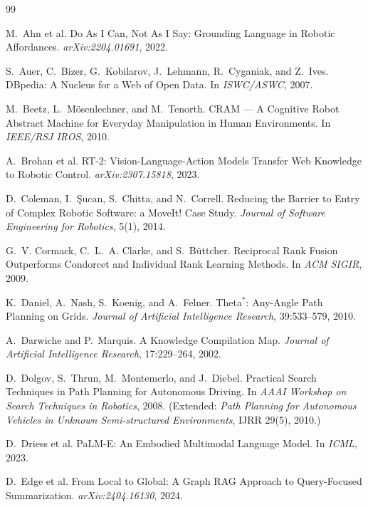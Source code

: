 \documentclass[10pt,a4paper]{article}
\begin{document}
\begin{thebibliography}{99}
\small

M.~Ahn et al.
\newblock Do As I Can, Not As I Say: Grounding Language in Robotic Affordances.
\newblock \emph{arXiv:2204.01691}, 2022.

S.~Auer, C.~Bizer, G.~Kobilarov, J.~Lehmann, R.~Cyganiak, and Z.~Ives.
\newblock DBpedia: A Nucleus for a Web of Open Data.
\newblock In \emph{ISWC/ASWC}, 2007.

M.~Beetz, L.~M{\"o}senlechner, and M.~Tenorth.
\newblock CRAM --- A Cognitive Robot Abstract Machine for Everyday Manipulation
  in Human Environments.
\newblock In \emph{IEEE/RSJ IROS}, 2010.

A.~Brohan et al.
\newblock RT-2: Vision-Language-Action Models Transfer Web Knowledge to Robotic
  Control.
\newblock \emph{arXiv:2307.15818}, 2023.

D.~Coleman, I.~{\c{S}}ucan, S.~Chitta, and N.~Correll.
\newblock Reducing the Barrier to Entry of Complex Robotic Software: a MoveIt!
  Case Study.
\newblock \emph{Journal of Software Engineering for Robotics}, 5(1), 2014.

G.~V. Cormack, C.~L.~A. Clarke, and S.~B{\"u}ttcher.
\newblock Reciprocal Rank Fusion Outperforms Condorcet and Individual Rank
  Learning Methods.
\newblock In \emph{ACM SIGIR}, 2009.

K.~Daniel, A.~Nash, S.~Koenig, and A.~Felner.
\newblock Theta$^*$: Any-Angle Path Planning on Grids.
\newblock \emph{Journal of Artificial Intelligence Research}, 39:533--579, 2010.

A.~Darwiche and P.~Marquis.
\newblock A Knowledge Compilation Map.
\newblock \emph{Journal of Artificial Intelligence Research}, 17:229--264, 2002.

D.~Dolgov, S.~Thrun, M.~Montemerlo, and J.~Diebel.
\newblock Practical Search Techniques in Path Planning for Autonomous Driving.
\newblock In \emph{AAAI Workshop on Search Techniques in Robotics}, 2008.
\newblock (Extended: \emph{Path Planning for Autonomous Vehicles in Unknown
  Semi-structured Environments}, IJRR 29(5), 2010.)

D.~Driess et al.
\newblock PaLM-E: An Embodied Multimodal Language Model.
\newblock In \emph{ICML}, 2023.

D.~Edge et al.
\newblock From Local to Global: A Graph RAG Approach to Query-Focused
  Summarization.
\newblock \emph{arXiv:2404.16130}, 2024.


\end{thebibliography}
\end{document}
